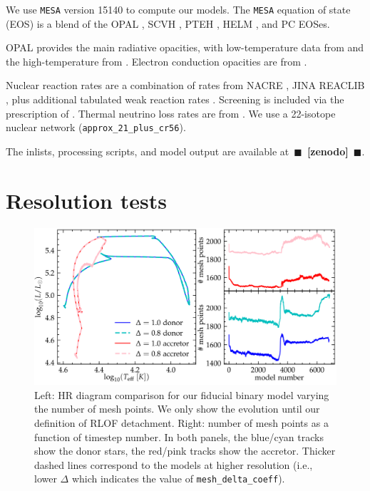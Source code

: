 \documentclass[twocolumn,twocolappendix,trackchanges]{aastex63}
\newcommand{\code}[1]{\texttt{#1}}
\newcommand{\todo}[1]{{\large $\blacksquare$~\textbf{\color{red}[#1]}}~$\blacksquare$}
\begin{document}
We use \code{MESA} version 15140 to compute our models.  The
\code{MESA} equation of state (EOS) is a blend of the OPAL \citet{Rogers2002}, SCVH
\citet{Saumon1995}, PTEH \citet{Pols1995}, HELM \citet{Timmes2000},
and PC \citet{Potekhin2010} EOSes.

OPAL \citep{Iglesias1993, Iglesias1996} provides the main radiative
opacities, with low-temperature data from \citet{Ferguson2005} and the
high-temperature from \citet{Buchler1976}. Electron conduction
opacities are from \citet{Cassisi2007}.

Nuclear reaction rates are a combination of rates from NACRE
\citep{Angulo1999}, JINA REACLIB \citep{Cyburt2010}, plus additional
tabulated weak reaction rates \citet{Fuller1985, Oda1994,
  Langanke2000}. Screening is included via the prescription of
\citet{Chugunov2007}.  Thermal neutrino loss rates are from
\citet{Itoh1996}. We use a
22-isotope nuclear network (\texttt{approx\_21\_plus\_cr56}).

The inlists, processing scripts, and model output are available at~\todo{zenodo}.

\section{Resolution tests}
\label{sec:res_tests}


\begin{figure}[htbp]
  \centering
  \includegraphics[width=\textwidth]{spatial_res_plot}
  \caption{Left: HR diagram comparison for our fiducial binary model varying
  the number of mesh points. We only show the evolution until our definition
  of RLOF detachment. Right: number of mesh points as a
  function of timestep number. In both panels, the blue/cyan tracks show the donor stars, the
red/pink tracks show the accretor. Thicker dashed lines correspond to
the models at higher resolution (i.e., lower $\Delta$ which indicates
the value of \texttt{mesh\_delta\_coeff}).}
\label{fig:sp_test}
\end{figure}
\end{document}
